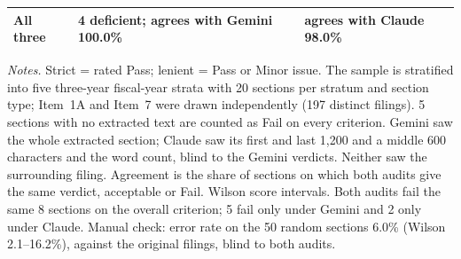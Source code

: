 \begin{table}[htbp]
\begin{tabular}{l r r l r r}
    \quad All three & \multicolumn{3}{l}{4 deficient; agrees with Gemini 100.0\%} & \multicolumn{2}{l}{agrees with Claude 98.0\%} \\
    \bottomrule
  \end{tabular}
  \begin{minipage}{0.95\linewidth}\vspace{4pt}\footnotesize
  \emph{Notes.} Strict = rated Pass; lenient = Pass or Minor issue. The sample is stratified into five three-year fiscal-year strata with 20 sections per stratum and section type; Item~1A and Item~7 were drawn independently (197 distinct filings). 5 sections with no extracted text are counted as Fail on every criterion. Gemini saw the whole extracted section; Claude saw its first and last 1{,}200 and a middle 600 characters and the word count, blind to the Gemini verdicts. Neither saw the surrounding filing. Agreement is the share of sections on which both audits give the same verdict, acceptable or Fail. Wilson score intervals. Both audits fail the same 8 sections on the overall criterion; 5 fail only under Gemini and 2 only under Claude. Manual check: error rate on the 50 random sections 6.0\% (Wilson 2.1--16.2\%), against the original filings, blind to both audits.
  \end{minipage}
\end{table}
